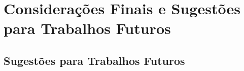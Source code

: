 \chapter{Considerações Finais e Sugestões para Trabalhos Futuros}
\label{cap:conlusao}


\section{Sugestões para Trabalhos Futuros}
\label{sec:futuros}
